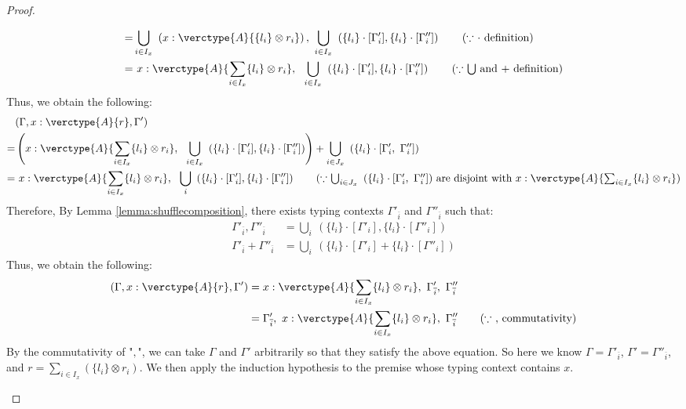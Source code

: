 \begin{proof}
\begin{itemize}
\begin{align*}
= &\bigcup_{i\in I_x} \ \left(x:\verctype{A}{\{l_i\}\otimes r_i}\right), \ \bigcup_{i\in I_x} \ \left(\{l_i\}\cdot[\Gamma'_i], \{l_i\}\cdot[\Gamma''_i]\right) \tag{$\because$ $\cdot$ definition}\\
= &\ x:\verctype{A}{\sum_{i\in I_x}\{l_i\}\otimes r_i}, \ \ \bigcup_{i\in I_x} \ \left(\{l_i\}\cdot[\Gamma'_i], \{l_i\}\cdot[\Gamma''_i]\right) \tag{$\because$ $\bigcup$ and $+$ definition}
\end{align*}
Thus, we obtain the following:
\begin{align*}
&(\Gamma, x:\verctype{A}{r}, \Gamma')\\
= &\left(x:\verctype{A}{\sum_{i\in I_x}\{l_i\}\otimes r_i}, \ \ \bigcup_{i\in I_x} \ \left(\{l_i\}\cdot[\Gamma'_i], \{l_i\}\cdot[\Gamma''_i]\right)\right) + \bigcup_{i\in J_x} \ \left(\{l_i\}\cdot[\Gamma'_i, \ \Gamma''_i]\right)\\
= &\ x:\verctype{A}{\sum_{i\in I_x}\{l_i\}\otimes r_i}, \ \ \bigcup_{i} \ \left(\{l_i\}\cdot[\Gamma'_i], \{l_i\}\cdot[\Gamma''_i]\right) \tag{$\because$ $\bigcup_{i\in J_x} \ \left(\{l_i\}\cdot[\Gamma'_i, \ \Gamma''_i]\right)$ are disjoint with $x:\verctype{A}{\sum_{i\in I_x}\{l_i\}\otimes r_i}$}
\end{align*}
Therefore, By Lemma \ref{lemma:shufflecomposition}, there exists typing contexts $\Gamma'_{\overline{i}}$ and $\Gamma''_{\overline{i}}$ such that:
\begin{align*}
\Gamma'_{\overline{i}}, \Gamma''_{\overline{i}} &= \bigcup_{i} \ \left(\{l_i\}\cdot[\Gamma'_i], \{l_i\}\cdot[\Gamma''_i]\right)\\
\Gamma'_{\overline{i}} + \Gamma''_{\overline{i}} &= \bigcup_{i} \ \left(\{l_i\}\cdot[\Gamma'_i] + \{l_i\}\cdot[\Gamma''_i]\right)
\end{align*}
Thus, we obtain the following:
\begin{align*}
(\Gamma, x:\verctype{A}{r}, \Gamma')
&= x:\verctype{A}{\sum_{i\in I_x}\{l_i\}\otimes r_i}, \ \Gamma'_{\overline{i}}, \ \Gamma''_{\overline{i}}\\
&= \Gamma'_{\overline{i}}, \ x:\verctype{A}{\sum_{i\in I_x}\{l_i\}\otimes r_i}, \ \Gamma''_{\overline{i}} \tag{$\because$ $,$ commutativity}
\end{align*}
By the commutativity of "$,$", we can take $\Gamma$ and $\Gamma'$ arbitrarily so that they satisfy the above equation. So here we know $\Gamma = \Gamma'_{\overline{i}}$, $\Gamma' = \Gamma''_{\overline{i}}$, and $r=\sum_{i\in I_x}(\{l_i\}\otimes r_i)$.
We then apply the induction hypothesis to the premise whose typing context contains $x$.

\end{itemize}
\end{proof}
